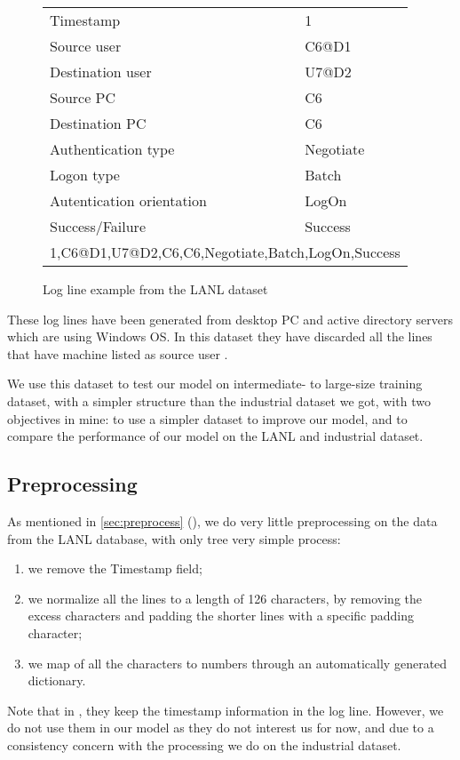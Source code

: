 \begin{figure}[!h]
\begin{center}

\begin{tabularx}{.9\textwidth}{|X|X|}
	\hline 
	Timestamp & 1\\
	Source user &C6@D1\\
	Destination user &U7@D2\\
	Source PC&C6\\
	Destination PC&C6\\
	Authentication type&Negotiate\\
	Logon type&Batch\\
	Autentication orientation&LogOn\\
	Success/Failure& Success\\ 
	\hline 
	\multicolumn{2}{|c|}{1,C6@D1,U7@D2,C6,C6,Negotiate,Batch,LogOn,Success} \\ 
	\hline 
\end{tabularx} 
\end{center}
\caption{Log line example from the LANL dataset \cite{rnn_attention_lanl}\label{tab:lanl}}
\end{figure} 
These log lines have been generated from desktop PC and active directory servers which are using Windows OS. In this dataset they have discarded all the lines that have machine listed as source user \cite{rnn_attention_lanl}.

We use this dataset to test our model on intermediate- to large-size training dataset, with a simpler structure than the industrial dataset we got, with two objectives in mine: to use a simpler dataset to improve our model, and to compare the performance of our model on the LANL and industrial dataset.

\subsection{Preprocessing}
As mentioned in \autoref{sec:preprocess} (), we do very little preprocessing on the data from the LANL database, with only tree very simple process:
\begin{enumerate}
	\item we remove the Timestamp field;
	\item we normalize all the lines to a length of 126 characters, by removing the excess characters and padding the shorter lines with a specific padding character;
	\item we map of all the characters to numbers through an automatically generated dictionary.
\end{enumerate}

Note that in \cite{rnn_attention_lanl}, they keep the timestamp information in the log line. However, we do not use them in our model as they do not interest us for now, and due to a consistency concern with the processing we do on the industrial dataset.
